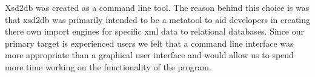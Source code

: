 Xsd2db was created as a command line tool.  The reason behind this choice is was that xsd2db was primarily intended to be a metatool to aid developers in creating there own import engines for specific xml data to relational databases.  Since our primary target is experienced users we felt that a command line interface was more appropriate than a graphical user interface and would allow us to spend more time working on the functionality of the program.    
